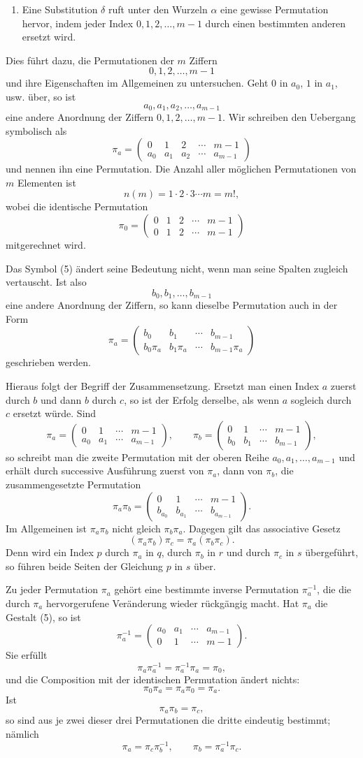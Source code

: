\documentclass[11pt]{article}
\providecommand{\perm}[2]{\begin{pmatrix}#1\\#2\end{pmatrix}}
\begin{document}
\begin{enumerate}[label=\arabic*.,leftmargin=2em]
\item Eine Substitution $\delta$ ruft unter den Wurzeln $\alpha$ eine gewisse Permutation hervor, indem jeder Index $0,1,2,\ldots,m-1$ durch einen bestimmten anderen ersetzt wird.
\end{enumerate}

Dies führt dazu, die Permutationen der $m$ Ziffern
\[
        0,1,2,\ldots,m-1
\]
und ihre Eigenschaften im Allgemeinen zu untersuchen. Geht $0$ in $a_0$, $1$ in $a_1$, usw. über, so ist
\[
        a_0,a_1,a_2,\ldots,a_{m-1}
\tag{4}
\]
eine andere Anordnung der Ziffern $0,1,2,\ldots,m-1$. Wir schreiben den Uebergang symbolisch als
\[
        \pi_a=\perm{0&1&2&\cdots&m-1}{a_0&a_1&a_2&\cdots&a_{m-1}}
\tag{5}
\]
und nennen ihn eine Permutation. Die Anzahl aller möglichen Permutationen von $m$ Elementen ist
\[
        n(m)=1\cdot2\cdot3\cdots m=m!,
\]
wobei die identische Permutation
\[
        \pi_0=\perm{0&1&2&\cdots&m-1}{0&1&2&\cdots&m-1}
\]
mitgerechnet wird.

Das Symbol (5) ändert seine Bedeutung nicht, wenn man seine Spalten zugleich vertauscht. Ist also
\[
        b_0,b_1,\ldots,b_{m-1}
\]
eine andere Anordnung der Ziffern, so kann dieselbe Permutation auch in der Form
\[
        \pi_a=\perm{b_0&b_1&\cdots&b_{m-1}}{b_0\pi_a&b_1\pi_a&\cdots&b_{m-1}\pi_a}
\tag{6}
\]
geschrieben werden.

Hieraus folgt der Begriff der Zusammensetzung. Ersetzt man einen Index $a$ zuerst durch $b$ und dann $b$ durch $c$, so ist der Erfolg derselbe, als wenn $a$ sogleich durch $c$ ersetzt würde. Sind
\[
        \pi_a=\perm{0&1&\cdots&m-1}{a_0&a_1&\cdots&a_{m-1}},
        \qquad
        \pi_b=\perm{0&1&\cdots&m-1}{b_0&b_1&\cdots&b_{m-1}},
\]
so schreibt man die zweite Permutation mit der oberen Reihe $a_0,a_1,\ldots,a_{m-1}$ und erhält durch successive Ausführung zuerst von $\pi_a$, dann von $\pi_b$, die zusammengesetzte Permutation
\[
        \pi_a\pi_b=\perm{0&1&\cdots&m-1}{b_{a_0}&b_{a_1}&\cdots&b_{a_{m-1}}}.
\tag{7}
\]
Im Allgemeinen ist $\pi_a\pi_b$ nicht gleich $\pi_b\pi_a$. Dagegen gilt das associative Gesetz
\[
        (\pi_a\pi_b)\pi_c=\pi_a(\pi_b\pi_c).
\tag{8}
\]
Denn wird ein Index $p$ durch $\pi_a$ in $q$, durch $\pi_b$ in $r$ und durch $\pi_c$ in $s$ übergeführt, so führen beide Seiten der Gleichung $p$ in $s$ über.

Zu jeder Permutation $\pi_a$ gehört eine bestimmte inverse Permutation $\pi_a^{-1}$, die die durch $\pi_a$ hervorgerufene Veränderung wieder rückgängig macht. Hat $\pi_a$ die Gestalt (5), so ist
\[
        \pi_a^{-1}=\perm{a_0&a_1&\cdots&a_{m-1}}{0&1&\cdots&m-1}.
\tag{9}
\]
Sie erfüllt
\[
        \pi_a\pi_a^{-1}=\pi_a^{-1}\pi_a=\pi_0,
\tag{10}
\]
und die Composition mit der identischen Permutation ändert nichts:
\[
        \pi_0\pi_a=\pi_a\pi_0=\pi_a.
\tag{11}
\]
Ist
\[
        \pi_a\pi_b=\pi_c,
\tag{12}
\]
so sind aus je zwei dieser drei Permutationen die dritte eindeutig bestimmt; nämlich
\[
        \pi_a=\pi_c\pi_b^{-1},\qquad
        \pi_b=\pi_a^{-1}\pi_c.
\tag{13}
\]
\end{document}
